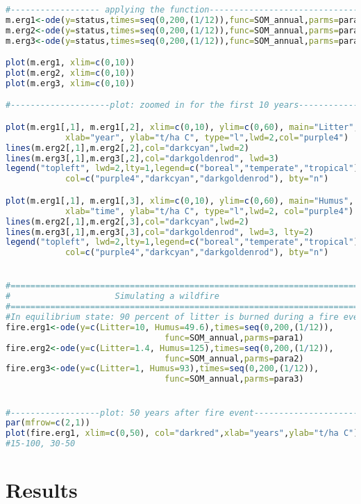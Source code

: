 \documentclass[10pt, a4paper]{article}
\begin{document}
\begin{lstlisting}[language=R]
#------------------ applying the function------------------------------------
m.erg1<-ode(y=status,times=seq(0,200,(1/12)),func=SOM_annual,parms=para1)
m.erg2<-ode(y=status,times=seq(0,200,(1/12)),func=SOM_annual,parms=para2)
m.erg3<-ode(y=status,times=seq(0,200,(1/12)),func=SOM_annual,parms=para3)

plot(m.erg1, xlim=c(0,10))
plot(m.erg2, xlim=c(0,10))
plot(m.erg3, xlim=c(0,10))

#--------------------plot: zoomed in for the first 10 years----------------

plot(m.erg1[,1], m.erg1[,2], xlim=c(0,10), ylim=c(0,60), main="Litter",
			xlab="year", ylab="t/ha C", type="l",lwd=2,col="purple4")
lines(m.erg2[,1],m.erg2[,2],col="darkcyan",lwd=2)
lines(m.erg3[,1],m.erg3[,2],col="darkgoldenrod", lwd=3)
legend("topleft", lwd=2,lty=1,legend=c("boreal","temperate","tropical"),
			col=c("purple4","darkcyan","darkgoldenrod"), bty="n")

plot(m.erg1[,1], m.erg1[,3], xlim=c(0,10), ylim=c(0,60), main="Humus",
			xlab="time", ylab="t/ha C", type="l",lwd=2, col="purple4")
lines(m.erg2[,1],m.erg2[,3],col="darkcyan",lwd=2)
lines(m.erg3[,1],m.erg3[,3],col="darkgoldenrod", lwd=3, lty=2)
legend("topleft", lwd=2,lty=1,legend=c("boreal","temperate","tropical"),
			col=c("purple4","darkcyan","darkgoldenrod"), bty="n")


#=============================================================================
#                     Simulating a wildfire
#=============================================================================
#In equilibrium state: 90 percent of litter is burned during a fire event 
fire.erg1<-ode(y=c(Litter=10, Humus=49.6),times=seq(0,200,(1/12)),
								func=SOM_annual,parms=para1)
fire.erg2<-ode(y=c(Litter=1.4, Humus=125),times=seq(0,200,(1/12)),
								func=SOM_annual,parms=para2)
fire.erg3<-ode(y=c(Litter=1, Humus=93),times=seq(0,200,(1/12)),
								func=SOM_annual,parms=para3)


#------------------plot: 50 years after fire event------------------------
par(mfrow=c(2,1))
plot(fire.erg1, xlim=c(0,50), col="darkred",xlab="years",ylab="t/ha C")
#15-100, 30-50


\end{lstlisting}


\newpage
\section{Results}
\end{document}
